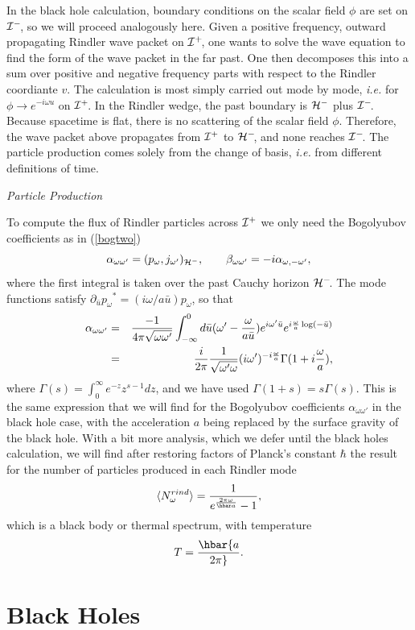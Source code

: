 \documentclass[12pt]{article}
\newcommand{\be}{\begin{equation}}
\newcommand{\ee}{\end{equation}}
\newcommand{\p}{\partial}
\newcommand{\sectiono}[1]{\section{#1}\setcounter{equation}{0}}
\def\bena{\begin{eqnarray}}
\def\eena{\end{eqnarray}}
\def\ph{{\cal H}^-}
\def\finf{{\cal I}^+}
\def\pinf{{\cal I}^-}
\def\p{p_{\omega}}
\def\alp{\alpha _{\omega \omega '}}
\def\bet{\beta_{\omega\omega '}}
\def\ub{\bar u}
\begin{document}
In the black hole calculation, boundary conditions on the
scalar field $\phi$ are set on $\pinf\!$, so we will proceed analogously here.
Given a positive frequency, outward propagating Rindler wave packet on $\finf\!$,
one wants to solve the wave equation to find the form of the wave packet in
the far past.
One then decomposes this into a sum over positive and negative frequency
parts with respect
to the Rindler coordiante $v$. The calculation is most simply carried out
mode by mode, {\it i.e.} for $\phi \rightarrow  e^{-i\omega u}$ on $\finf\!$.
In the
Rindler wedge, the past boundary is $\ph$ plus $\pinf\!$. Because spacetime
is flat, there is
no scattering of the scalar field $\phi$. Therefore, the wave packet above
propagates from $\finf$ to $\ph\!$, and none reaches $\pinf\!$.  The particle
production comes
solely from the change of basis, {\it i.e.} from different definitions of time.

\vskip 0.1in\goodbreak\noindent
{\it Particle Production}
\vskip 0.05in

To compute the flux
of Rindler particles across $\finf$ we only need the Bogolyubov coefficients
as in (\ref{bogtwo})
%
\be\label{rinbog} \alp = (\p ,j_{\omega '} )_{\ph}  ,\qquad
\bet=  -i\alpha_{\omega ,-\omega '},\ee
%
where the first integral is taken over the past Cauchy horizon $\ph\!$.
The mode functions satisfy  $\partial_{\ub}\p{}^* =(i\omega / a \ub)\p $,
so that
%
\bena\label{rinalp}\alp &=& {-1\over 4\pi \sqrt{\omega \omega '}}
\int_{-\infty}^0 d\ub (\omega ' -{\omega \over a\ub } ) e^{i\omega ' \ub}
e ^{i {\omega \over a} \log(-\ub )} \\
&=&{i\over 2\pi }{1\over \sqrt{\omega ' \omega }}
(i\omega ' )^{-i {\omega \over a}}\Gamma (1 +i {\omega \over a} ), \eena
%
where $\Gamma (s) =\int _0 ^{\infty} e ^{-z} z^{s-1} dz$, and
we have used $\Gamma (1+s) =s\Gamma (s)$.
This is the same expression that we will find for the Bogolyubov coefficients
$\alp$ in the black hole case, with the acceleration $a$ being replaced by
the surface
gravity of the black hole. With a bit more analysis, which we defer until
the black
holes calculation, we will find after restoring factors of Planck's
constant $\hbar$ the
result for the number of particles produced in each Rindler mode
%
\be\label{rinspec} \langle N_{\omega }^{rind} \rangle = {1\over e^{ {2\pi \omega \over
\hbar a} } -1 } ,\ee
%
which is a black body or thermal spectrum, with temperature
%
\be\label{rintemp}T=\hbar {a\over 2\pi}.\ee
%

\sectiono{Black Holes}
\label{section4}
\end{document}
